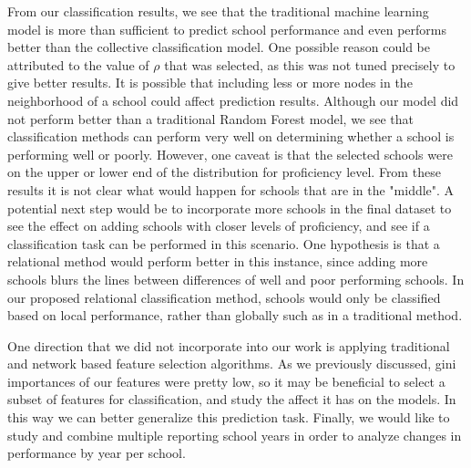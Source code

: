 From our classification results, we see that the traditional machine learning model is more than sufficient to predict school performance and even performs better than the collective classification model. One possible reason could be attributed to the value of $\rho$ that was selected, as this was not tuned precisely to give better results. It is possible that including less or more nodes in the neighborhood of a school could affect prediction results. Although our model did not perform better than a traditional Random Forest model, we see that classification methods can perform very well on determining whether a school is performing well or poorly. However, one caveat is that the selected schools were on the upper or lower end of the distribution for proficiency level. From these results it is not clear what would happen for schools that are in the "middle". A potential next step would be to incorporate more schools in the final dataset to see the effect on adding schools with closer levels of proficiency, and see if a classification task can be performed in this scenario. One hypothesis is that a relational method would perform better in this instance, since adding more schools blurs the lines between differences of well and poor performing schools. In our proposed relational classification method, schools would only be classified based on local performance, rather than globally such as in a traditional method.

One direction that we did not incorporate into our work is applying traditional and network based feature selection algorithms. As we previously discussed, gini importances of our features were pretty low, so it may be beneficial to select a subset of features for classification, and study the affect it has on the models. In this way we can better generalize this prediction task. Finally, we would like to study and combine multiple reporting school years in order to analyze changes in performance by year per school.

